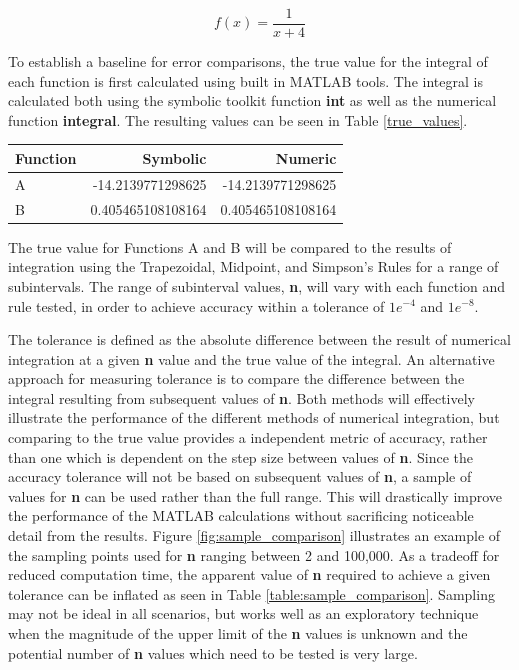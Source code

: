 \documentclass[a4paper]{article}
\begin{document}
\begin{equation}
f(x) = \frac{1}{x+4}
\label{eq:fb}
\end{equation}

To establish a baseline for error comparisons, the true value for the integral of each function is first calculated using built in MATLAB tools. The integral is calculated both using the symbolic toolkit function \textbf{int} as well as the numerical function \textbf{integral}. The resulting values can be seen in Table \ref{true_values}.

\bgroup
\def\arraystretch{1.5}
\begin{center}
	\centering
	\begin{tabular}{l|r|r}
	\textbf{Function} & \textbf{Symbolic} & \textbf{Numeric} \\
	\hline
	A & -14.2139771298625 & -14.2139771298625\\
	B & 0.405465108108164 & 0.405465108108164
	\end{tabular}
	\label{true_values}
\end{center}
\egroup

The true value for Functions A and B will be compared to the results of integration using the Trapezoidal, Midpoint, and Simpson's Rules for a range of subintervals. The range of subinterval values, \textbf{n}, will vary with each function and rule tested, in order to achieve accuracy within a tolerance of $1e^{-4}$ and $1e^{-8}$. 

The tolerance is defined as the absolute difference between the result of numerical integration at a given \textbf{n} value and the true value of the integral. An alternative approach for measuring tolerance is to compare the difference between the integral resulting from subsequent values of \textbf{n}. Both methods will effectively illustrate the performance of the different methods of numerical integration, but comparing to the true value provides a independent metric of accuracy, rather than one which is dependent on the step size between values of \textbf{n}. Since the accuracy tolerance will not be based on subsequent values of \textbf{n}, a sample of values for \textbf{n} can be used rather than the full range. This will drastically improve the performance of the MATLAB calculations without sacrificing noticeable detail from the results. Figure \ref{fig:sample_comparison} illustrates an example of the sampling points used for \textbf{n} ranging between 2 and 100,000. As a tradeoff for reduced computation time, the apparent value of \textbf{n} required to achieve a given tolerance can be inflated as seen in Table \ref{table:sample_comparison}. Sampling may not be ideal in all scenarios, but works well as an exploratory technique when the magnitude of the upper limit of the \textbf{n} values is unknown and the potential number of \textbf{n} values which need to be tested is very large.
\end{document}
